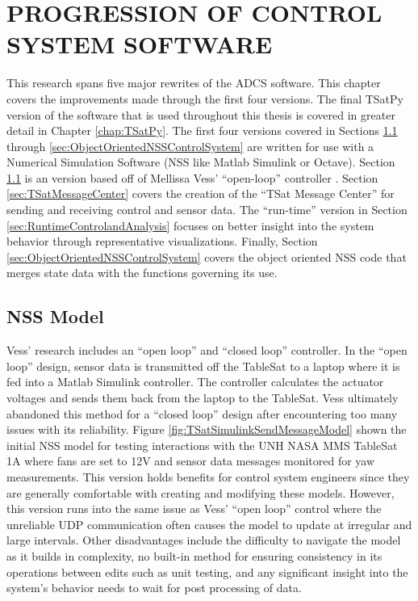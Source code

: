 
\chapter{PROGRESSION OF CONTROL SYSTEM SOFTWARE}
\label{chap:ProgressionOfControlSystemSoftware}

This research spans five major rewrites of the ADCS software.  This chapter covers the improvements made through the first four versions.  The final TSatPy version of the software that is used throughout this thesis is covered in greater detail in Chapter \ref{chap:TSatPy}.  The first four versions covered in Sections \ref{sec:NSSModel} through \ref{sec:ObjectOrientedNSSControlSystem} are written for use with a Numerical Simulation Software (NSS like Matlab Simulink or Octave).  Section \ref{sec:NSSModel} is an version based off of Mellissa Vess' ``open-loop'' controller \cite{vessthesis}.  Section \ref{sec:TSatMessageCenter} covers the creation of the ``TSat Message Center'' for sending and receiving control and sensor data.  The ``run-time'' version in Section \ref{sec:RuntimeControlandAnalysis} focuses on better insight into the system behavior through representative visualizations.  Finally, Section \ref{sec:ObjectOrientedNSSControlSystem} covers the object oriented NSS code that merges state data with the functions governing its use.

\section{NSS Model}
\label{sec:NSSModel}

Vess' research \cite{vessthesis} includes an ``open loop'' and ``closed loop'' controller.  In the ``open loop'' design, sensor data is transmitted off the TableSat to a laptop where it is fed into a Matlab Simulink controller.  The controller calculates the actuator voltages and sends them back from the laptop to the TableSat.  Vess ultimately abandoned this method for a ``closed loop'' design after encountering too many issues with its reliability.  Figure \ref{fig:TSatSimulinkSendMessageModel} shown the initial NSS model for testing interactions with the UNH NASA MMS TableSat 1A where fans are set to 12V and sensor data messages monitored for yaw measurements.  This version holds benefits for control system engineers since they are generally comfortable with creating and modifying these models.  However, this version runs into the same issue as Vess' ``open loop'' control where the unreliable UDP communication often causes the model to update at irregular and large intervals.  Other disadvantages include the difficulty to navigate the model as it builds in complexity, no built-in method for ensuring consistency in its operations between edits such as unit testing, and any significant insight into the system's behavior needs to wait for post processing of data.


